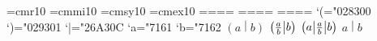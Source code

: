 \font\tenrm=cmr10 \font\teni=cmmi10 \font\tensy=cmsy10 \font\tenex=cmex10
=\tenrm {}=\teni {}=\tensy {}=\tenex
{}=\tenrm {}=\teni {}=\tensy {}=\tenex
{}=\tenrm {}=\teni {}=\tensy {}=\tenex
\delcode`(="028300 \delcode`)="029301 \delcode`|="26A30C \mathcode`a="7161 \mathcode`b="7162
\hbox{$\left(a\middle|b\right)$}
\hbox{$\left(a\over b\middle|b\right)$}
\hbox{$\left(a\middle|{a\over b}\middle|b\right)$}
\hbox{$\left.a\middle|b\right.$}
